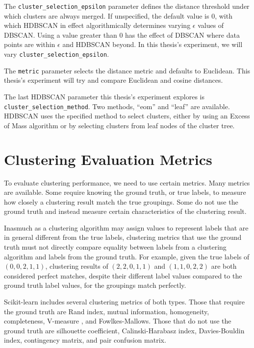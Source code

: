The \texttt{cluster\_selection\_epsilon} parameter defines the distance threshold under which clusters are always merged. If unspecified, the default value is 0, with which HDBSCAN in effect algorithmically determines varying $\epsilon$ values of DBSCAN. Using a value greater than 0 has the effect of DBSCAN where data points are within $\epsilon$ and HDBSCAN beyond. In this thesis's experiment, we will vary \texttt{cluster\_selection\_epsilon}.

The \texttt{metric} parameter selects the distance metric and defaults to Euclidean. This thesis's experiment will try and compare Euclidean and cosine distances.

The last HDBSCAN parameter this thesis's experiment explores is \texttt{cluster\_selection\_method}. Two methods, ``eom'' and ``leaf'' are available. HDBSCAN uses the specified method to select clusters, either by using an Excess of Mass algorithm or by selecting clusters from leaf nodes of the cluster tree.

\section{Clustering Evaluation Metrics}

To evaluate clustering performance, we need to use certain metrics. Many metrics are available. Some require knowing the ground truth, or true labels, to measure how closely a clustering result match the true groupings. Some do not use the ground truth and instead measure certain characteristics of the clustering result.

Inasmuch as a clustering algorithm may assign values to represent labels that are in general different from the true labels, clustering metrics that use the ground truth must not directly compare equality between labels from a clustering algorithm and labels from the ground truth. For example, given the true labels of $(0, 0, 2, 1, 1)$, clustering results of $(2, 2, 0, 1, 1)$ and $(1, 1, 0, 2, 2)$ are both considered perfect matches, despite their different label values compared to the ground truth label values, for the groupings match perfectly.

Scikit-learn includes several clustering metrics of both types. Those that require the ground truth are Rand index, mutual information, homogeneity, completeness, V-measure \cite{hirschberg_v-measure_2007}, and Fowlkes-Mallows. Those that do not use the ground truth are silhouette coefficient, Calinski-Harabasz index, Davies-Bouldin index, contingency matrix, and pair confusion matrix.


